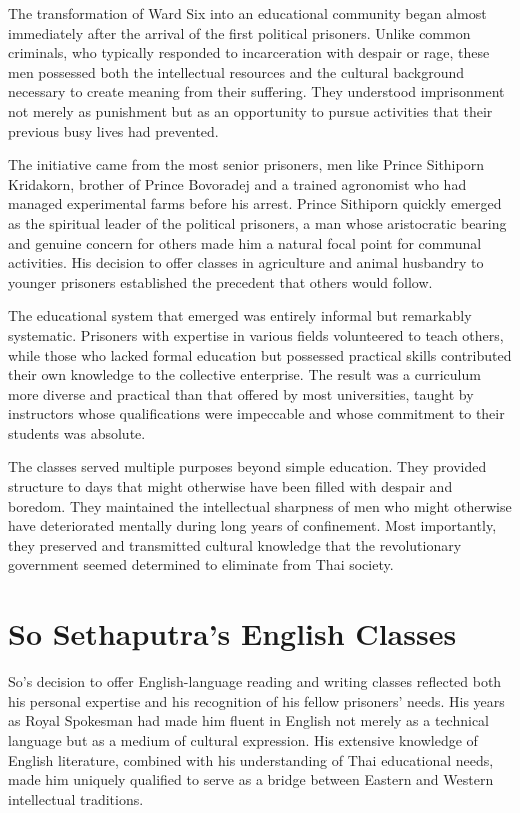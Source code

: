 \documentclass[
  Letterpaper,
]{scrbook}
\begin{document}
The transformation of Ward Six into an educational community began
almost immediately after the arrival of the first political prisoners.
Unlike common criminals, who typically responded to incarceration with
despair or rage, these men possessed both the intellectual resources and
the cultural background necessary to create meaning from their
suffering. They understood imprisonment not merely as punishment but as
an opportunity to pursue activities that their previous busy lives had
prevented.

The initiative came from the most senior prisoners, men like Prince
Sithiporn Kridakorn, brother of Prince Bovoradej and a trained
agronomist who had managed experimental farms before his arrest. Prince
Sithiporn quickly emerged as the spiritual leader of the political
prisoners, a man whose aristocratic bearing and genuine concern for
others made him a natural focal point for communal activities. His
decision to offer classes in agriculture and animal husbandry to younger
prisoners established the precedent that others would follow.

The educational system that emerged was entirely informal but remarkably
systematic. Prisoners with expertise in various fields volunteered to
teach others, while those who lacked formal education but possessed
practical skills contributed their own knowledge to the collective
enterprise. The result was a curriculum more diverse and practical than
that offered by most universities, taught by instructors whose
qualifications were impeccable and whose commitment to their students
was absolute.

The classes served multiple purposes beyond simple education. They
provided structure to days that might otherwise have been filled with
despair and boredom. They maintained the intellectual sharpness of men
who might otherwise have deteriorated mentally during long years of
confinement. Most importantly, they preserved and transmitted cultural
knowledge that the revolutionary government seemed determined to
eliminate from Thai society.

\section{So Sethaputra's English
Classes}\label{so-sethaputras-english-classes}

So's decision to offer English-language reading and writing classes
reflected both his personal expertise and his recognition of his fellow
prisoners' needs. His years as Royal Spokesman had made him fluent in
English not merely as a technical language but as a medium of cultural
expression. His extensive knowledge of English literature, combined with
his understanding of Thai educational needs, made him uniquely qualified
to serve as a bridge between Eastern and Western intellectual
traditions.
\end{document}
